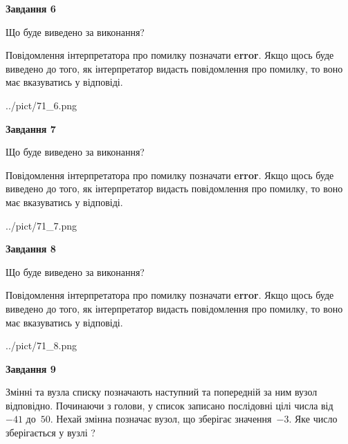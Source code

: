 \documentclass[12pt, ukrainian]{article}
\begin{document}
{\begin {large}
{\begin {center}\textbf{Завдання 6}\end {center}}\par
Що буде виведено за виконання?

Повідомлення інтерпретатора про помилку позначати \textbf{error}.
Якщо щось буде виведено до того, як інтерпретатор видасть повідомлення про помилку, 
то воно має вказуватись у відповіді. \par


\begin{center}
	{../pict/71_6.png}
\end{center}
\newpage

{\begin {center}\textbf{Завдання 7}\end {center}}\par
Що буде виведено за виконання?

Повідомлення інтерпретатора про помилку позначати \textbf{error}.
Якщо щось буде виведено до того, як інтерпретатор видасть повідомлення про помилку, 
то воно має вказуватись у відповіді. \par


\begin{center}
	{../pict/71_7.png}
\end{center}
\newpage

{\begin {center}\textbf{Завдання 8}\end {center}}\par
Що буде виведено за виконання?

Повідомлення інтерпретатора про помилку позначати \textbf{error}.
Якщо щось буде виведено до того, як інтерпретатор видасть повідомлення про помилку, 
то воно має вказуватись у відповіді. \par


\begin{center}
	{../pict/71_8.png}
\end{center}
\newpage

{\begin {center}\textbf{Завдання 9}\end {center}}\par
Змінні  та  вузла списку позначають наступний та попередній за ним вузол відповідно. Починаючи з голови, у список записано послідовні цілі числа від~$-41$ до~$50$. Нехай змінна  позначає вузол, що зберігає значення~$-3$.
Яке число зберігається у вузлі  ?\par
\newpage


\end{large}}
\end{document}
